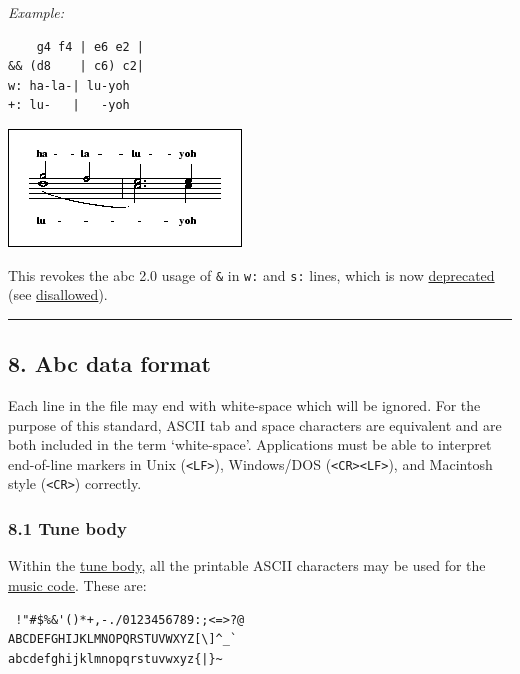 \documentclass[oneside]{book}
\begin{document}
\emph{Example:}

\begin{verbatim}
    g4 f4 | e6 e2 |
&& (d8    | c6) c2|
w: ha-la-| lu-yoh
+: lu-   |   -yoh
\end{verbatim}

\href{/wiki/_detail/abc:standard:overlay3-80.png?id=abc\%3Astandard\%3Av2.1}{\includegraphics{wiki/_media/abc-standard-overlay3-80.png}}

This revokes the abc 2.0 usage of \texttt{\&} in \texttt{w:} and
\texttt{s:} lines, which is now
\protect\hyperlink{outdated_syntax}{deprecated} (see
\protect\hyperlink{disallowed_voice_overlay}{disallowed}).

\begin{center}\rule{0.5\linewidth}{\linethickness}\end{center}

\hypertarget{abc_data_format}{\subsection{8. Abc data
format}\label{abc_data_format}}

Each line in the file may end with white-space which will be ignored.
For the purpose of this standard, ASCII tab and space characters are
equivalent and are both included in the term `white-space'. Applications
must be able to interpret end-of-line markers in Unix
(\texttt{\textless{}LF\textgreater{}}), Windows/DOS
(\texttt{\textless{}CR\textgreater{}\textless{}LF\textgreater{}}), and
Macintosh style (\texttt{\textless{}CR\textgreater{}}) correctly.

\hypertarget{tune_body}{\subsubsection{8.1 Tune body}\label{tune_body}}

Within the \protect\hyperlink{tune_body_definition}{tune body}, all the
printable ASCII characters may be used for the
\protect\hyperlink{music_code_definition}{music code}. These are:

\begin{verbatim}
 !"#$%&'()*+,-./0123456789:;<=>?@
ABCDEFGHIJKLMNOPQRSTUVWXYZ[\]^_`
abcdefghijklmnopqrstuvwxyz{|}~
\end{verbatim}
\end{document}

